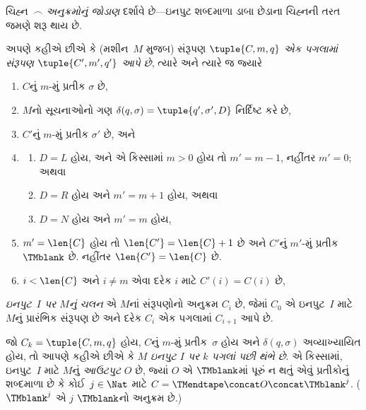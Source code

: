 \begin{explain}
ચિહ્ન~$\frown$ \emph{અનુક્રમોનું જોડાણ} દર્શાવે છે---ઇનપુટ
શબ્દમાળા ડાબા છેડાના ચિહ્નની તરત જમણે શરૂ થાય છે.
\end{explain}


\begin{defn}
અપણે કહીએ છીએ કે (મશીન~$M$ મુજબ) સંરૂપણ
$\tuple{C, m, q}$ \emph{એક પગલામાં સંરૂપણ
$\tuple{C', m', q'}$ આપે છે}, ત્યારે અને ત્યારે જ જ્યારે
\begin{enumerate}
\item $C$નું $m$-મું પ્રતીક $\sigma$ છે,
\item $M$નો સૂચનાઓનો ગણ $\delta(q, \sigma) =
  \tuple{q', \sigma', D}$ નિર્દિષ્ટ કરે છે,
\item $C'$નું $m$-મું પ્રતીક $\sigma'$ છે, અને
\item
\begin{enumerate}
\item $D = L$ હોય, અને એ કિસ્સામાં $m>0$ હોય તો
  $m' = m - 1$, નહીંતર $m'=0$; અથવા
\item $D = R$ હોય અને $m' = m + 1$ હોય, અથવા
\item $D = N$ હોય અને $m' = m$ હોય,
\end{enumerate}
\item $m' = \len{C}$ હોય તો $\len{C'} = \len{C} + 1$ છે
  અને $C'$નું $m'$-મું પ્રતીક~$\TMblank$ છે. નહીંતર
  $\len{C'}=\len{C}$ છે.
\item $i < \len{C}$ અને $i \neq m$ એવા દરેક $i$ માટે
  $C'(i) = C(i)$ છે,
\end{enumerate}
\end{defn}

\begin{defn}
\emph{ઇનપુટ~$I$ પર $M$નું ચલન} એ $M$નાં સંરૂપણોનો
અનુક્રમ $C_i$ છે, જેમાં $C_0$ એ ઇનપુટ~$I$ માટે
$M$નું પ્રારંભિક સંરૂપણ છે અને દરેક $C_i$ એક પગલામાં
$C_{i+1}$ આપે છે.

જો $C_k = \tuple{C, m, q}$ હોય, $C$નું $m$-મું
પ્રતીક~$\sigma$ હોય અને $\delta(q, \sigma)$ અવ્યાખ્યાયિત
હોય, તો આપણે કહીએ છીએ કે $M$ \emph{ઇનપુટ $I$ પર
$k$ પગલાં પછી થંભે છે}. એ કિસ્સામાં, ઇનપુટ~$I$ માટે
$M$નું \emph{આઉટપુટ} $O$ છે, જ્યાં $O$ એ
$\TMblank$માં પૂરું ન થતું એવું પ્રતીકોનું શબ્દમાળા છે કે
કોઈ~$j \in \Nat$ માટે
$C = \TMendtape \concat O \concat \TMblank^j$.
($\TMblank^j$ એ $j$ $\TMblank$નો અનુક્રમ છે.)
\end{defn}

